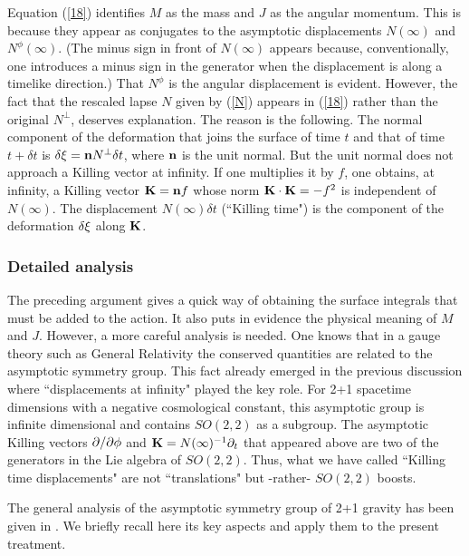 Equation (\ref{18}) identifies $M$ as the mass and $J$ as the
angular momentum. This is because they appear as conjugates to
the asymptotic displacements $N(\infty)$ and $N^{\phi}(\infty)$.
(The minus sign in front of $N(\infty)$ appears because,
conventionally, one introduces a minus sign in the generator
when the displacement is along a timelike direction.) That
$N^{\phi}$ is the angular displacement is evident. However, the
fact that the rescaled lapse $N$ given by (\ref{N}) appears in
(\ref{18}) rather than the original $N^{\perp}$, deserves
explanation. The reason is the following.  The normal component
of the deformation that joins the surface of time $t$ and that
of time $t + \delta t$ is $\delta {\bf \xi} = {\bf n} N^{\perp}
\delta t$, where ${\bf n}$ is the unit
normal. But the unit normal does not approach a Killing vector
at infinity. If one multiplies it by $f$, one obtains, at
infinity, a Killing vector ${\bf K} = {\bf n}f$ whose norm ${\bf
K} \cdot {\bf K} = - f^2$ is independent of $N(\infty)$. The
displacement $N(\infty) \delta t$ (``Killing time") is the
component of the deformation $\delta{\bf \xi}$ along ${\bf K}$.



\subsubsection{ Detailed analysis}

The preceding argument gives a quick way of obtaining the
surface integrals that must be added to the action. It also puts
in evidence the physical meaning of $M$ and $J$. However, a
more careful analysis is needed. One knows that in a gauge theory such as
 General
Relativity the conserved quantities are related to the
asymptotic symmetry group. This fact already
emerged in the previous discussion where ``displacements at
infinity" played the key role. For 2+1 spacetime dimensions with
a negative cosmological constant, this asymptotic group is
infinite dimensional and contains $SO(2,2)$ as a subgroup. The
asymptotic Killing vectors $\partial /\partial{\phi}$ and ${\bf K}  =
N(\infty)^{-1}\partial_t$ that appeared above are two of the
generators in the Lie algebra of $SO(2,2)$. Thus, what we have
called ``Killing time displacements" are not ``translations"
but -rather- $SO(2,2)$ boosts.

The general analysis of the asymptotic symmetry group
of 2+1 gravity has been given in \cite{6}. We briefly recall
here its key aspects and apply them to the present treatment.

